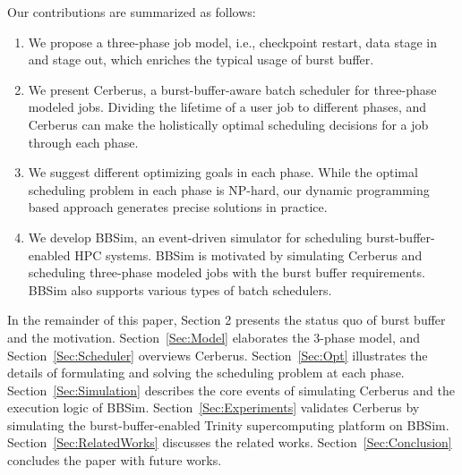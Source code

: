 Our contributions are summarized as follows:
\begin{enumerate}
        \item %
                We propose a three-phase job model, i.e.,  checkpoint restart,
                data stage in and stage out, which enriches the typical usage of burst buffer.
        \item   We present Cerberus,
                a burst-buffer-aware batch scheduler for three-phase modeled jobs.
                Dividing the lifetime of a user job to different phases, and
                Cerberus can make the holistically optimal scheduling decisions 
                for a job through each phase.
        \item   We suggest different optimizing goals in each phase.
                While the optimal scheduling problem in each phase is NP-hard,
                our dynamic programming based approach generates precise solutions
                in practice.
        \item   We develop BBSim, an event-driven simulator for scheduling
                burst-buffer-enabled HPC systems.
                BBSim is motivated by simulating Cerberus and scheduling
                three-phase modeled jobs with the burst buffer requirements.
                BBSim also supports various types of batch schedulers.
\end{enumerate}


In the remainder of this paper, Section 2 presents the status quo of burst buffer and
the motivation.
Section~\ref{Sec:Model} elaborates the 3-phase model, and Section~\ref{Sec:Scheduler} overviews Cerberus.
Section~\ref{Sec:Opt} illustrates the details of formulating and solving the scheduling problem at each phase.
Section~\ref{Sec:Simulation} describes the core events of simulating Cerberus and the execution logic of BBSim.
Section~\ref{Sec:Experiments} validates Cerberus by simulating the burst-buffer-enabled
Trinity supercomputing platform on BBSim. Section~\ref{Sec:RelatedWorks} discusses the related works.
Section~\ref{Sec:Conclusion} concludes the paper with future works.


